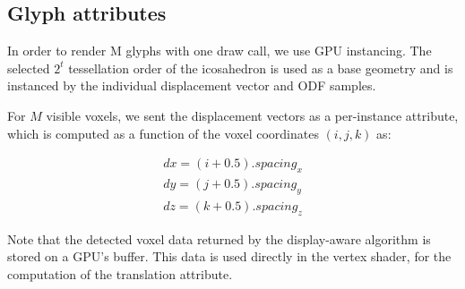 \documentclass[twoside,twocolumn,10pt]{article}
\begin{document}
\subsection{Glyph attributes}
\label{ssec::glyph_attributes}

In order to render M glyphs with one draw call, we use GPU instancing. The selected $2^t$ tessellation order of the icosahedron is used as a base geometry and is instanced by the individual displacement vector and ODF samples.

For $M$ visible voxels, we sent the displacement vectors as a per-instance attribute, which is computed as a function of the voxel coordinates $(i, j, k)$ as:

\begin{align}
 \label{eq::translation}
    dx = (i + 0.5).spacing_x \nonumber\\
    dy = (j + 0.5).spacing_y \\
    dz = (k + 0.5).spacing_z \nonumber
\end{align}



Note that the detected voxel data returned by the display-aware algorithm is stored on a GPU's buffer. This data is used directly in the vertex shader, for the computation of the translation attribute.







\end{document}
